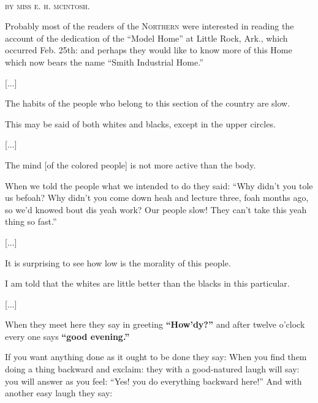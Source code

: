 \begin{ipquote}
\begin{center}
\\
\textsc{by miss e. h. mcintosh.}    
\end{center}
{Probably most of the readers of the \textsc{Northern} were interested in reading the account of the dedication of the “Model Home” at Little Rock, Ark., which occurred Feb. 25th: and perhaps they would like to know more of this Home which now bears the name “Smith Industrial Home.”

\centering
{[...]}

The habits of the people who belong to this section of the country are slow.} {This may be said of both whites and blacks, except in the upper circles.

\centering
{[...]}

The mind [of the colored people] is not more active than the body.} {When we told the people what we intended to do they said: “Why didn’t you tole us befoah? Why didn’t you come down heah and lecture three, foah months ago, so we’d knowed bout dis yeah work? Our people slow! They can’t take this yeah thing so fast.”

\centering
{[...]}

It is surprising to see how low is the morality of this people.} {I am told that the whites are little better than the blacks in this particular.

\centering
{[...]}

When they meet here they say in greeting \textbf{“How’dy?”} and after twelve o’clock every one says \textbf{“good evening.”}} {If you want anything done as it ought to be done they say:  When you find them doing a thing backward and exclaim:  they with a good-natured laugh will say:  you will answer as you feel: “Yes! you do everything backward here!” And with another easy laugh they say: 

}
\end{ipquote}
